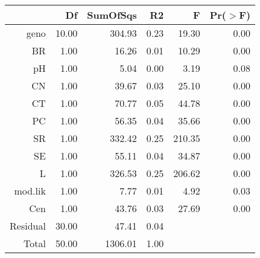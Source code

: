 \begin{table}[ht]
\centering
\begin{tabular}{rrrrrr}
  \hline
 & Df & SumOfSqs & R2 & F & Pr($>$F) \\ 
  \hline
geno & 10.00 & 304.93 & 0.23 & 19.30 & 0.00 \\ 
  BR & 1.00 & 16.26 & 0.01 & 10.29 & 0.00 \\ 
  pH & 1.00 & 5.04 & 0.00 & 3.19 & 0.08 \\ 
  CN & 1.00 & 39.67 & 0.03 & 25.10 & 0.00 \\ 
  CT & 1.00 & 70.77 & 0.05 & 44.78 & 0.00 \\ 
  PC & 1.00 & 56.35 & 0.04 & 35.66 & 0.00 \\ 
  SR & 1.00 & 332.42 & 0.25 & 210.35 & 0.00 \\ 
  SE & 1.00 & 55.11 & 0.04 & 34.87 & 0.00 \\ 
  L & 1.00 & 326.53 & 0.25 & 206.62 & 0.00 \\ 
  mod.lik & 1.00 & 7.77 & 0.01 & 4.92 & 0.03 \\ 
  Cen & 1.00 & 43.76 & 0.03 & 27.69 & 0.00 \\ 
  Residual & 30.00 & 47.41 & 0.04 &  &  \\ 
  Total & 50.00 & 1306.01 & 1.00 &  &  \\ 
   \hline
\end{tabular}
\end{table}
